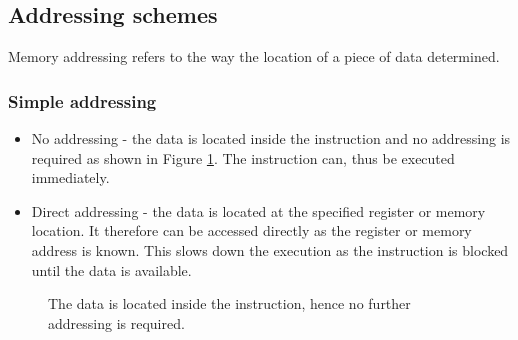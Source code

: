 \documentclass{report}
\begin{document}
\subsection{Addressing schemes}

Memory addressing refers to the way the location of a piece of data determined.

\subsubsection{Simple addressing}

\begin{itemize}
    \item{No addressing - the data is located inside the instruction and no
        addressing is required as shown in Figure \ref{fig:no-addressing}. The
        instruction can, thus be executed immediately.}
    \item{Direct addressing - the data is located at the specified register or
        memory location. It therefore can be accessed directly as the register
        or memory address is known. This slows down the execution as the
        instruction is blocked until the data is available.}
\end{itemize}

\begin {figure}[H]
\centering
{}
\caption {The data is located inside the instruction, hence no further
          addressing is required.}
\label {fig:no-addressing}
\end {figure}
\end{document}
